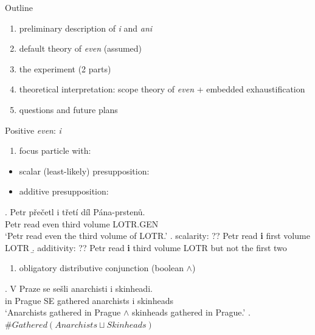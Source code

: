 \documentclass[ignorenonframetext,]{beamer}
\providecommand{\tightlist}{%
  \setlength{\itemsep}{0pt}\setlength{\parskip}{0pt}}
\begin{document}
\begin{frame}{Outline}

\begin{enumerate}
\def\labelenumi{\arabic{enumi})}
\tightlist
\item
  preliminary description of \emph{i} and \emph{ani}
\item
  default theory of \emph{even} (assumed)
\item
  the experiment (2 parts)
\item
  theoretical interpretation: scope theory of \emph{even} + embedded
  exhaustification
\item
  questions and future plans
\end{enumerate}

\end{frame}

\begin{frame}{Positive \emph{even}: \emph{i}}

\begin{enumerate}
\def\labelenumi{\arabic{enumi})}
\tightlist
\item
  focus particle with:
\end{enumerate}

\begin{itemize}
\tightlist
\item
  scalar (least-likely) presupposition: \Next[a]
\item
  additive presupposition: \Next[b]
\end{itemize}

\exg. Petr přečetl i třetí díl Pána-prstenů.\\
Petr read even third volume LOTR.GEN\\
`Petr read even the third volume of LOTR.' \a. scalarity: ?? Petr read
\textbf{i} first volume LOTR \b. additivity: ?? Petr read \textbf{i}
third volume LOTR but not the first two

\end{frame}

\begin{frame}

\begin{enumerate}
\def\labelenumi{\arabic{enumi})}
\setcounter{enumi}{1}
\tightlist
\item
  obligatory distributive conjunction (boolean \(\wedge\))
\end{enumerate}

\exg. V Praze se sešli anarchisti i skinheadi.\\
in Prague SE gathered anarchists i skinheads\\
`Anarchists gathered in Prague \(\wedge\) skinheads gathered in Prague.'
\a. \(\#Gathered(Anarchists\sqcup Skinheads)\)

\end{frame}
\end{document}
